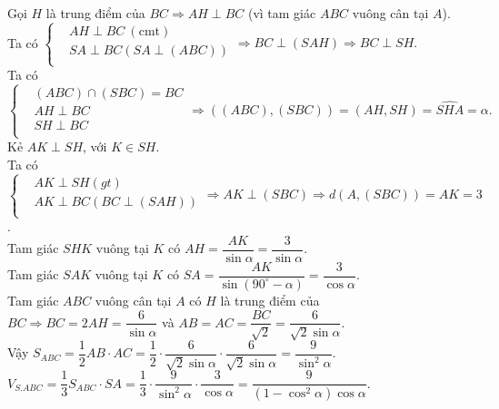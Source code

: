 \begin{ex}
{\begin{center}
		\end{center}
		Gọi $H$ là trung điểm của $BC\Rightarrow AH\perp BC$ (vì tam giác $ABC$ vuông cân tại $A$).\\
		Ta có $\left\{\begin{aligned}
			&AH\perp BC~\left(\mathrm{cmt}\right)\\ 
			&SA\perp BC\left(SA\perp\left(ABC\right)\right)\\ 
		\end{aligned}\right.\Rightarrow BC\perp\left(SAH\right)\Rightarrow BC\perp SH.$\\
		Ta có $\left\{\begin{aligned}
			&\left(ABC\right)\cap\left(SBC\right)=BC\\ 
			&AH\perp BC\\ 
			&SH\perp BC\\ 
		\end{aligned}\right.\Rightarrow\left(\left(ABC\right),\left(SBC\right)\right)=\left(AH,SH\right)=\widehat{SHA}=\alpha .$\\
		Kẻ $AK\perp SH$, với $K\in SH$.\\
		Ta có $\left\{\begin{aligned}
			&AK\perp SH\left(gt\right)\\ 
			&AK\perp BC\left(BC\perp\left(SAH\right)\right)\\ 
		\end{aligned}\right.\Rightarrow AK\perp\left(SBC\right)\Rightarrow d\left(A,\left(SBC\right)\right)=AK=3$.\\
		Tam giác $SHK$ vuông tại $K$ có $AH=\dfrac{AK}{\sin\alpha}=\dfrac{3}{\sin\alpha}$.\\
		Tam giác $SAK$ vuông tại $K$ có $SA=\dfrac{AK}{\sin\left(90^\circ-\alpha\right)}=\dfrac{3}{\cos\alpha}.$\\
		Tam giác $ABC$ vuông cân tại $A$ có $H$ là trung điểm của $BC\Rightarrow BC=2AH=\dfrac{6}{\sin\alpha}$ và $AB=AC=\dfrac{BC}{\sqrt{2}}=\dfrac{6}{\sqrt{2}\sin\alpha}.$\\
		Vậy $S_{ABC}=\dfrac{1}{2}AB\cdot AC=\dfrac{1}{2}\cdot\dfrac{6}{\sqrt{2}\sin\alpha}\cdot\dfrac{6}{\sqrt{2}\sin\alpha}=\dfrac{9}{\sin^2\alpha}.$\\
		$V_{S.ABC}=\dfrac{1}{3}{S_{ABC}}\cdot SA=\dfrac{1}{3}\cdot\dfrac{9}{\sin^2\alpha}\cdot\dfrac{3}{\cos\alpha}=\dfrac{9}{\left(1-\cos^2\alpha\right)\cos\alpha}.$\\
}
\end{ex}
